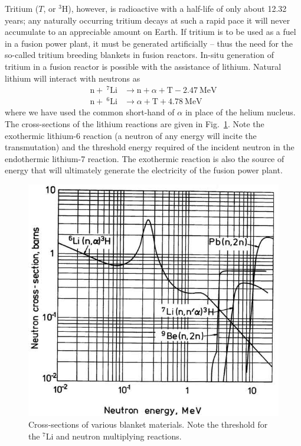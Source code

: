 Tritium ($T$, or $^3$H), however, is radioactive with a half-life of only about 12.32 years; any naturally occurring tritium decays at such a rapid pace it will never accumulate to an appreciable amount on Earth. If tritium is to be used as a fuel in a fusion power plant, it must be generated artificially -- thus the need for the so-called tritium breeding blankets in fusion reactors. In-situ generation of tritium in a fusion reactor is possible with the assistance of lithium. Natural lithium will interact with neutrons as
\begin{subequations}\label{eq:lithium-t}
\begin{align}
	\mathrm{n} + \ ^7\mathrm{Li} &\xrightarrow \ \mathrm{n}+\alpha + \mathrm{T} -2.47\ \text{MeV}\label{eq:li7-t}\\
	\mathrm{n} + \ ^6\mathrm{Li} &\xrightarrow \  \alpha + \mathrm{T} +4.78\ \text{MeV} \label{eq:li6-t}
\end{align}
\end{subequations}
where we have used the common short-hand of $\alpha$ in place of the helium nucleus. The cross-sections of the lithium reactions are given in Fig.~\ref{fig:li-xsects}. Note the exothermic lithium-6 reaction (a neutron of any energy will incite the transmutation) and the threshold energy required of the incident neutron in the endothermic lithium-7 reaction. The exothermic reaction is also the source of energy that will ultimately generate the electricity of the fusion power plant.

\begin{figure}[ht]
	\centering
	\includegraphics[width=\singleimagewidth]{chapters/figures/breeding_xsecs} 
	\caption{Cross-sections of various blanket materials. Note the threshold for the $^7$Li and neutron multiplying reactions.}
	\label{fig:li-xsects}
\end{figure}

